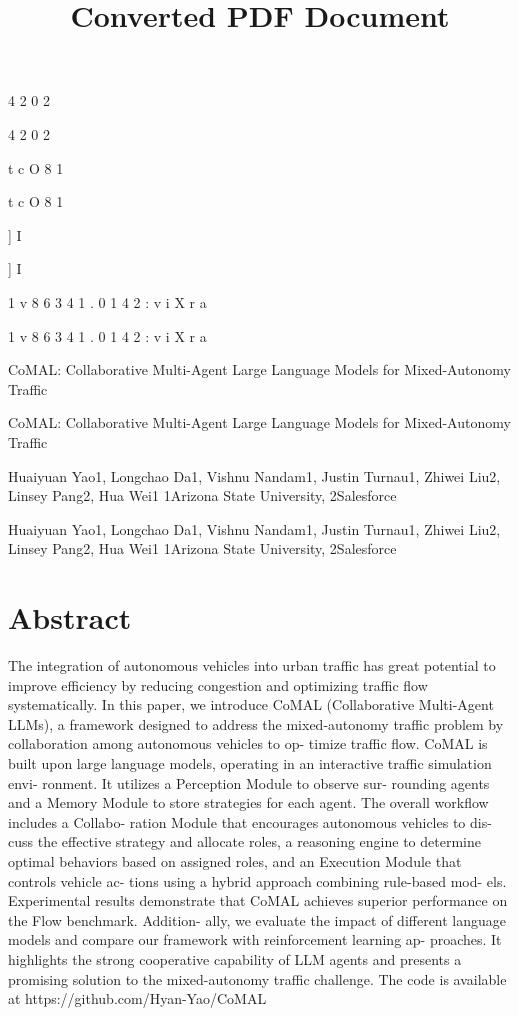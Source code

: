 \documentclass[12pt]{article}
\title{Converted PDF Document}
\author{}
\date{}
\begin{document}
\maketitle

4
2
0
2


4
2
0
2


t
c
O
8
1


t
c
O
8
1


]
I


]
I


1
v
8
6
3
4
1
.
0
1
4
2
:
v
i
X
r
a


1
v
8
6
3
4
1
.
0
1
4
2
:
v
i
X
r
a


CoMAL: Collaborative Multi-Agent Large Language Models for
Mixed-Autonomy Traffic


CoMAL: Collaborative Multi-Agent Large Language Models for
Mixed-Autonomy Traffic


Huaiyuan Yao1, Longchao Da1, Vishnu Nandam1, Justin Turnau1,
Zhiwei Liu2, Linsey Pang2, Hua Wei1
1Arizona State University, 2Salesforce


Huaiyuan Yao1, Longchao Da1, Vishnu Nandam1, Justin Turnau1,
Zhiwei Liu2, Linsey Pang2, Hua Wei1
1Arizona State University, 2Salesforce


\section{Abstract}


The integration of autonomous vehicles into urban traffic has
great potential to improve efficiency by reducing congestion
and optimizing traffic flow systematically. In this paper, we
introduce CoMAL (Collaborative Multi-Agent LLMs), a
framework designed to address the mixed-autonomy traffic
problem by collaboration among autonomous vehicles to op-
timize traffic flow. CoMAL is built upon large language
models, operating in an interactive traffic simulation envi-
ronment.
It utilizes a Perception Module to observe sur-
rounding agents and a Memory Module to store strategies
for each agent. The overall workflow includes a Collabo-
ration Module that encourages autonomous vehicles to dis-
cuss the effective strategy and allocate roles, a reasoning
engine to determine optimal behaviors based on assigned
roles, and an Execution Module that controls vehicle ac-
tions using a hybrid approach combining rule-based mod-
els. Experimental results demonstrate that CoMAL achieves
superior performance on the Flow benchmark. Addition-
ally, we evaluate the impact of different language models
and compare our framework with reinforcement learning ap-
proaches.
It highlights the strong cooperative capability
of LLM agents and presents a promising solution to the
mixed-autonomy traffic challenge. The code is available at
https://github.com/Hyan-Yao/CoMAL
\end{document}
